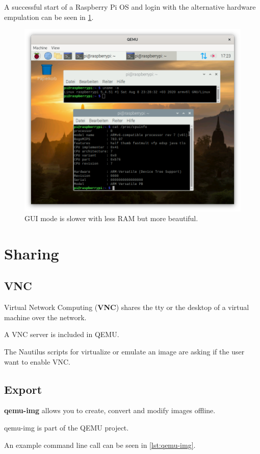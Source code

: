 \noindent A successful start of a Raspberry Pi OS and login with the alternative hardware empulation can be seen in \cref{fig:gui}.

\begin{figure}[htbp]  %
  \centering
  \includegraphics[width=.75\textwidth]{figures/boot-rpi-with-gui.png}
  \caption[Qemu RPi GUI]{GUI mode is slower with less RAM but more beautiful.}
  \label{fig:gui}
\end{figure}

\section{Sharing}

\subsection{VNC}

Virtual Network Computing (\textbf{VNC}) shares the tty or the desktop of a virtual machine over the network.

A VNC server is included in QEMU.

The Nautilus scripts for virtualize or emulate an image are asking if the user want to enable VNC.

\subsection{Export}

\textbf{qemu-img} allows you to create, convert and modify images offline.

qemu-img is part of the QEMU project.

An example command line call can be seen in \cref{lst:qemu-img}.

